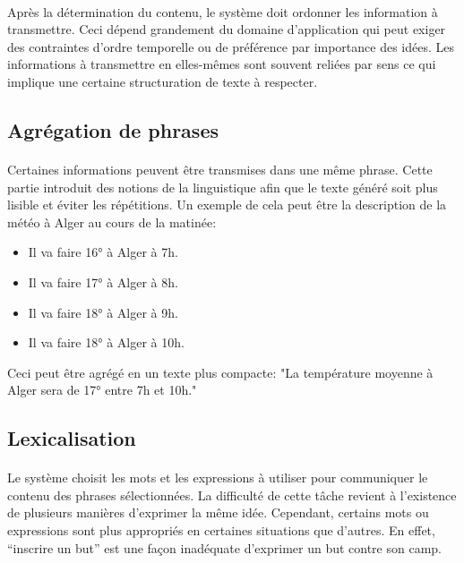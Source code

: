	\paragraph{}
	Après la détermination du contenu, le système doit ordonner les information à transmettre. Ceci dépend grandement du domaine d’application qui peut exiger des contraintes d’ordre temporelle ou de préférence par importance des idées. Les informations à transmettre en elles-mêmes sont souvent reliées par sens ce qui implique une certaine structuration de texte à respecter.\newpage
	\subsection{Agrégation de phrases}
	\paragraph{}
	Certaines informations peuvent être transmises dans une même phrase. Cette partie introduit des notions de la linguistique afin que le texte généré soit plus lisible et éviter les répétitions. Un exemple de cela peut être la description de la météo à Alger au cours de la matinée:
	\begin{itemize}
		\item Il va faire 16° à Alger à 7h.
		\item Il va faire 17° à Alger à 8h.
		\item Il va faire 18° à Alger à 9h.
		\item Il va faire 18° à Alger à 10h.
	\end{itemize}
	Ceci peut être agrégé en un texte plus compacte: "La température moyenne à Alger sera de 17° entre 7h et 10h."
	
	\subsection{Lexicalisation}
	\paragraph{}Le système choisit les mots et les expressions à utiliser pour communiquer le contenu des phrases sélectionnées. La difficulté de cette tâche revient à l’existence de plusieurs manières d’exprimer la même idée. Cependant, certains mots ou expressions sont plus appropriés en certaines situations que d’autres. En effet, “inscrire un but” est une façon inadéquate d’exprimer un but contre son camp\cite{Gatt2018}.
	
